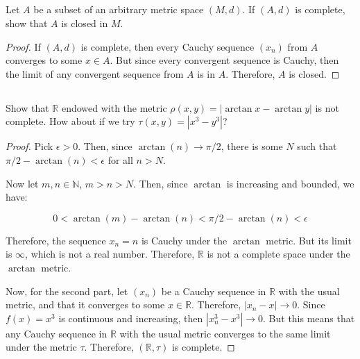
\subsection{} Let $A$ be a subset of an arbitrary metric space $(M, d)$. If $(A, d)$ is complete, show that $A$ is closed in $M$.

\begin{proof}
If $(A,d)$ is complete, then every Cauchy sequence $(x_n)$ from $A$ converges to some $x \in A$. But since every convergent sequence is Cauchy, then the limit of any convergent sequence from $A$ is in $A$. Therefore, $A$ is closed.
\end{proof}

\newpage

\subsection{} Show that $\mathbb{R}$ endowed with the metric $\rho(x, y) = |\arctan x - \arctan y|$ is not complete. How about if we try $\tau(x, y) = |x^3 - y^3|$? 

\begin{proof}
Pick $\epsilon > 0$. Then, since $\arctan(n) \rightarrow \pi/2$, there is some $N$ such that $\pi/2 - \arctan(n) < \epsilon$ for all $n > N$.

Now let $m,n\in \mathbb{N}$, $m > n > N$. Then, since $\arctan$ is increasing and bounded, we have:

$$0 < \arctan(m) - \arctan(n) < \pi/2 - \arctan(n) < \epsilon$$


Therefore, the sequence $x_n=n$ is Cauchy under the $\arctan$ metric. But its limit is $\infty$, which is not a real number. Therefore, $\mathbb{R}$ is not a complete space under the $\arctan$ metric.

\vspace{1em}

Now, for the second part, let $(x_n)$ be a Cauchy sequence in $\mathbb{R}$ with the usual metric, and that it converges to some $x \in \mathbb{R}$. Therefore, $|x_n - x| \rightarrow 0$. Since $f(x) = x^3$ is continuous and increasing, then $|x_n^3 - x^3| \rightarrow 0$. But this means that any Cauchy sequence in $\mathbb{R}$ with the usual metric converges to the same limit under the metric $\tau$. Therefore, $(\mathbb{R}, \tau)$ is complete.

\end{proof}


